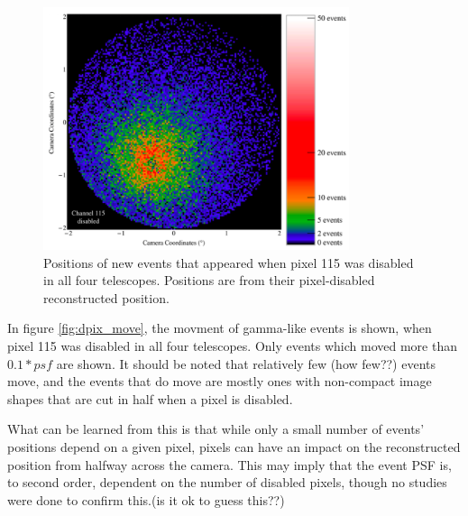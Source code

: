     \begin{figure}[ht]
      \begin{center}
        \includegraphics[width=0.8\textwidth]{images/disabled_pixel/appearing_events}
        \caption[Newly Appearing Events]{Positions of new events that appeared when pixel 115 was disabled in all four telescopes.  Positions are from their pixel-disabled reconstructed position.}\label{fig:dpix_appear}
      \end{center}
    \end{figure}

    In figure \ref{fig:dpix_move}, the movment of gamma-like events is shown, when pixel 115 was disabled in all four telescopes.
    Only events which moved more than $0.1*psf$ are shown.
    It should be noted that relatively few (how few??) events move, and the events that do move are mostly ones with non-compact image shapes that are cut in half when a pixel is disabled.

    What can be learned from this is that while only a small number of events' positions depend on a given pixel, pixels can have an impact on the reconstructed position from halfway across the camera.
    This may imply that the event PSF is, to second order, dependent on the number of disabled pixels, though no studies were done to confirm this.(is it ok to guess this??)


